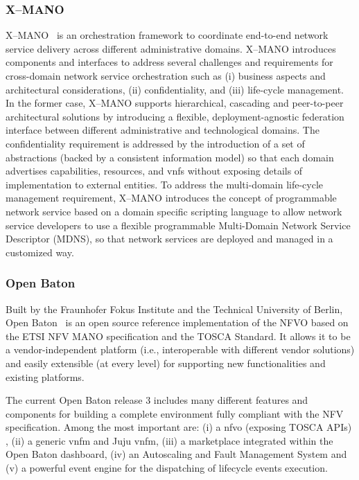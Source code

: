 \subsubsection{X--MANO}
X--MANO~\cite{francescon2017x} is an orchestration framework to coordinate end-to-end network service delivery across different administrative domains. X--MANO introduces components and interfaces to address several challenges and requirements for cross-domain network service orchestration such as (i) business aspects and architectural considerations, (ii) confidentiality, and (iii) life-cycle management. In the former case,  X--MANO supports hierarchical, cascading and peer-to-peer architectural solutions by introducing a flexible, deployment-agnostic federation interface between different administrative and technological domains. The confidentiality requirement is addressed by the introduction of a set of abstractions (backed by a consistent information model) so that each domain advertises capabilities, resources, and \glspl{vnf} without exposing details of implementation to external entities. To address the multi-domain life-cycle management requirement, X--MANO introduces the concept of programmable network service based on a domain specific scripting language to allow network service developers to use a flexible programmable Multi-Domain Network Service Descriptor (MDNS), so that network services are deployed and managed in a customized way.

\subsubsection{Open Baton}
Built by the Fraunhofer Fokus Institute and the Technical University of Berlin, Open Baton~\cite{openbatongit} is an open source reference implementation of the NFVO based on the ETSI NFV MANO specification and the TOSCA Standard. It allows it to be a vendor-independent platform (i.e., interoperable with different vendor solutions) and easily extensible (at every level) for supporting new functionalities and existing platforms.

The current Open Baton release 3 includes many different features and components for building a complete environment fully compliant with the NFV specification. Among the most important are: (i) a \gls{nfvo} (exposing TOSCA APIs) , (ii) a generic \gls{vnfm} and Juju \gls{vnfm}, (iii) a marketplace integrated within the Open Baton dashboard, (iv) an Autoscaling and Fault Management System and (v) a powerful event engine for the dispatching of lifecycle events execution.

